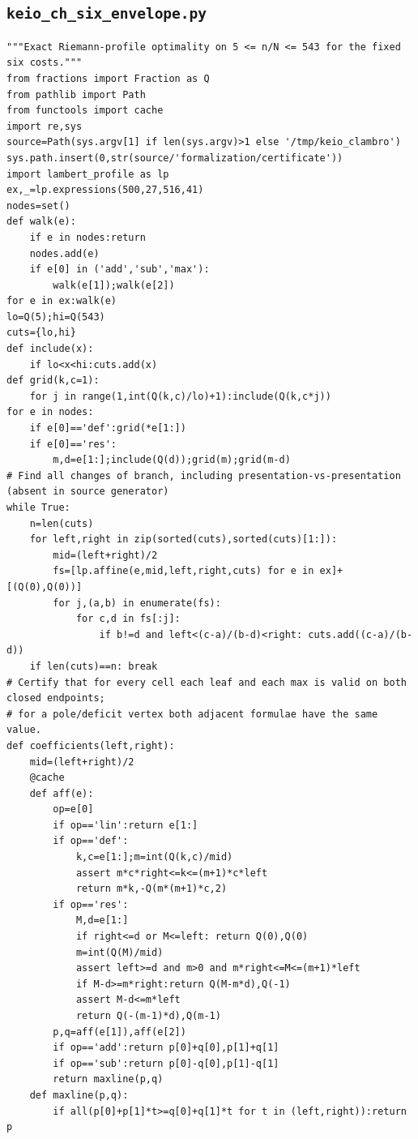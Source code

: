 \documentclass[11pt,a4paper]{article}
\begin{document}
\subsection*{\texttt{keio\_ch\_six\_envelope.py}}
\begin{Verbatim}[fontsize=\footnotesize,breakanywhere=false]
"""Exact Riemann-profile optimality on 5 <= n/N <= 543 for the fixed six costs."""
from fractions import Fraction as Q
from pathlib import Path
from functools import cache
import re,sys
source=Path(sys.argv[1] if len(sys.argv)>1 else '/tmp/keio_clambro')
sys.path.insert(0,str(source/'formalization/certificate'))
import lambert_profile as lp
ex,_=lp.expressions(500,27,516,41)
nodes=set()
def walk(e):
    if e in nodes:return
    nodes.add(e)
    if e[0] in ('add','sub','max'):
        walk(e[1]);walk(e[2])
for e in ex:walk(e)
lo=Q(5);hi=Q(543)
cuts={lo,hi}
def include(x):
    if lo<x<hi:cuts.add(x)
def grid(k,c=1):
    for j in range(1,int(Q(k,c)/lo)+1):include(Q(k,c*j))
for e in nodes:
    if e[0]=='def':grid(*e[1:])
    if e[0]=='res':
        m,d=e[1:];include(Q(d));grid(m);grid(m-d)
# Find all changes of branch, including presentation-vs-presentation (absent in source generator)
while True:
    n=len(cuts)
    for left,right in zip(sorted(cuts),sorted(cuts)[1:]):
        mid=(left+right)/2
        fs=[lp.affine(e,mid,left,right,cuts) for e in ex]+[(Q(0),Q(0))]
        for j,(a,b) in enumerate(fs):
            for c,d in fs[:j]:
                if b!=d and left<(c-a)/(b-d)<right: cuts.add((c-a)/(b-d))
    if len(cuts)==n: break
# Certify that for every cell each leaf and each max is valid on both closed endpoints;
# for a pole/deficit vertex both adjacent formulae have the same value.
def coefficients(left,right):
    mid=(left+right)/2
    @cache
    def aff(e):
        op=e[0]
        if op=='lin':return e[1:]
        if op=='def':
            k,c=e[1:];m=int(Q(k,c)/mid)
            assert m*c*right<=k<=(m+1)*c*left
            return m*k,-Q(m*(m+1)*c,2)
        if op=='res':
            M,d=e[1:]
            if right<=d or M<=left: return Q(0),Q(0)
            m=int(Q(M)/mid)
            assert left>=d and m>0 and m*right<=M<=(m+1)*left
            if M-d>=m*right:return Q(M-m*d),Q(-1)
            assert M-d<=m*left
            return Q(-(m-1)*d),Q(m-1)
        p,q=aff(e[1]),aff(e[2])
        if op=='add':return p[0]+q[0],p[1]+q[1]
        if op=='sub':return p[0]-q[0],p[1]-q[1]
        return maxline(p,q)
    def maxline(p,q):
        if all(p[0]+p[1]*t>=q[0]+q[1]*t for t in (left,right)):return p

\end{Verbatim}
\end{document}
